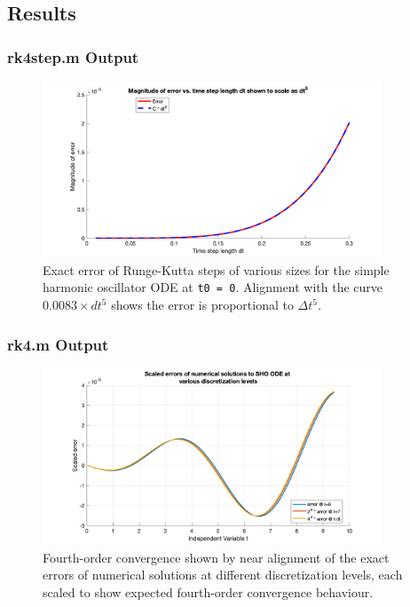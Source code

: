 \documentclass[10pt]{article}
\def\code#1{\texttt{#1}} %
\begin{document}
\subsection*{Results}

\subsubsection*{rk4step.m Output}


\begin{figure}[H]
\centering
\includegraphics[width=0.9\textwidth]{rk4step.png}
\caption{Exact error of Runge-Kutta steps of various sizes for the simple harmonic oscillator ODE at 
\code{t0 = 0}. Alignment with the curve $0.0083 \times dt^5$ shows the error is proportional to 
$\Delta t^5$.}\label{rk4step_fig}
\end{figure}

\subsubsection*{rk4.m Output}

\begin{figure}[H]
\centering
\includegraphics[width=0.9\textwidth]{trk4_sho_2.png}
\caption{Fourth-order convergence shown by near alignment of the exact errors of numerical solutions 
at different discretization levels, each scaled to show expected fourth-order convergence behaviour.
}\label{trk4_sho_2_fig}
\end{figure}
\end{document}
